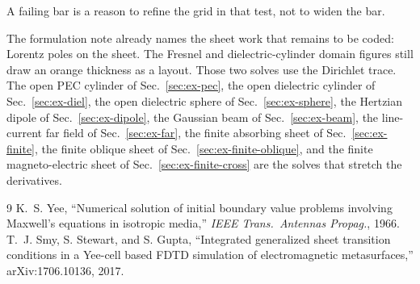 \documentclass[11pt,a4paper]{article}
\begin{document}
A failing bar is a reason to refine the grid in that test, not to widen the bar.

The formulation note already names the sheet work that remains
to be coded: Lorentz poles on the sheet. The Fresnel
and dielectric-cylinder domain figures still draw an orange thickness as
a layout. Those two solves use the Dirichlet trace. The open PEC cylinder
of Sec.~\ref{sec:ex-pec}, the open dielectric cylinder of
Sec.~\ref{sec:ex-diel}, the open dielectric sphere of
Sec.~\ref{sec:ex-sphere}, the Hertzian dipole of
Sec.~\ref{sec:ex-dipole}, the Gaussian beam of
Sec.~\ref{sec:ex-beam}, the line-current far field of
Sec.~\ref{sec:ex-far}, the finite absorbing sheet of
Sec.~\ref{sec:ex-finite}, the finite oblique sheet of
Sec.~\ref{sec:ex-finite-oblique}, and the finite magneto-electric sheet of
Sec.~\ref{sec:ex-finite-cross} are the solves that stretch the derivatives.

\clearpage
\begin{thebibliography}{9}
K.~S. Yee, ``Numerical solution of initial boundary value problems
involving Maxwell's equations in isotropic media,'' \emph{IEEE Trans.\
Antennas Propag.}, 1966.
T.~J. Smy, S. Stewart, and S. Gupta, ``Integrated generalized sheet
transition conditions in a Yee-cell based FDTD simulation of
electromagnetic metasurfaces,'' arXiv:1706.10136, 2017.
\end{thebibliography}
\end{document}
